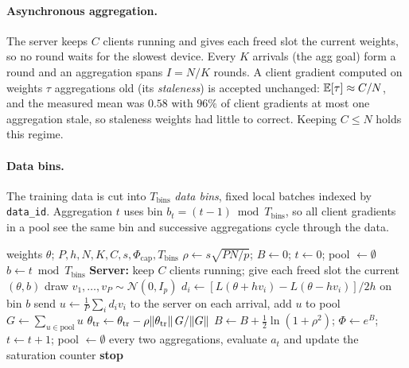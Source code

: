 \paragraph{Asynchronous aggregation.}\label{sec:ft:async}
The server keeps $C$ clients running and gives each freed slot the current weights, so no round waits for the slowest device. Every $K$ arrivals (the agg goal) form a round and an aggregation spans $I=N/K$ rounds.
A client gradient computed on weights $\tau$ aggregations old (its \emph{staleness}) is accepted unchanged: $\mathbb{E}[\tau]\approx C/N$, and the measured mean was $0.58$ with $96\%$ of client gradients at most one aggregation stale, so staleness weights had little to correct.
Keeping $C\le N$ holds this regime.

\paragraph{Data bins.}
The training data is cut into $T_{\mathrm{bins}}$ \emph{data bins}, fixed local batches indexed by \texttt{data\_id}. Aggregation $t$ uses bin $b_t=(t-1)\bmod T_{\mathrm{bins}}$, so all client gradients in a pool see the same bin and successive aggregations cycle through the data.

\begin{algorithm}[t]
\caption{FluxTune}
\label{alg:fluxtune}
\begin{algorithmic}[1]
\Require weights $\theta$; $P,h,N,K,C,s,\Phi_{\mathrm{cap}},T_{\mathrm{bins}}$
\State $\rho\gets s\sqrt{PN/p}$;\; $B\gets 0$;\; $t\gets 0$;\; pool $\gets\emptyset$
  \State $b\gets t\bmod T_{\mathrm{bins}}$
  \State \textbf{Server:} keep $C$ clients running; give each freed slot the current $(\theta,b)$
    \State draw $v_1,\dots,v_P\sim\mathcal{N}(0,I_p)$
    \State $d_i\gets[L(\theta{+}hv_i)-L(\theta{-}hv_i)]/2h$ on bin $b$ 
    \State send $u\gets\frac1P\sum_i d_iv_i$ to the server
  \EndFor
  \State on each arrival, add $u$ to pool 
    \State $G\gets\sum_{u\in\text{pool}}u$
     \State $\theta_{\mathrm{tr}}\gets\theta_{\mathrm{tr}}-\rho\lVert \theta_{\mathrm{tr}}\rVert\,G/\lVert G\rVert$ \EndIf
    \State $B\gets B+\tfrac12\ln(1+\rho^2)$;\; $\Phi\gets e^{B}$;\; $t\gets t+1$;\; pool $\gets\emptyset$
    \State every two aggregations, evaluate $a_t$ and update the saturation counter
     \State \textbf{stop} \EndIf
  \EndIf
\EndWhile
\end{algorithmic}
\end{algorithm}

